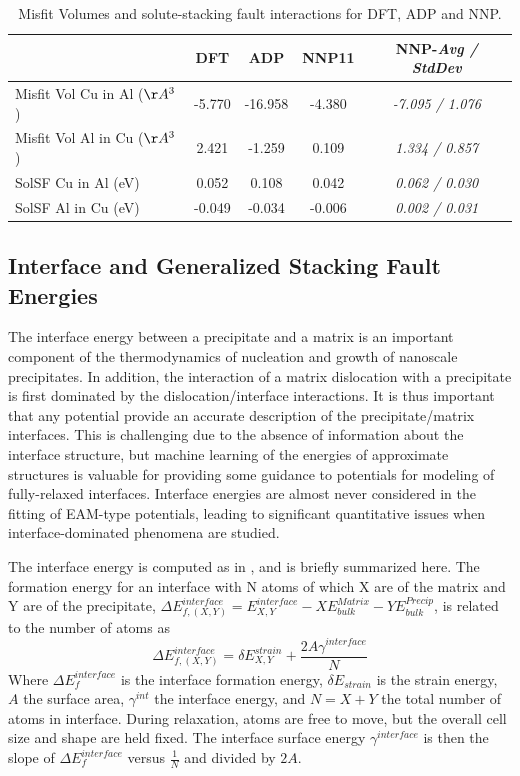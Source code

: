 \documentclass{article}
\begin{document}
\begin{table}[H]
\begin{tabular}{l|cccc}%
\hline%
&DFT&ADP&NNP11& NNP-\emph{Avg / StdDev}\\%
\hline%
Misfit Vol Cu in Al ($\AA^3$)&{-}5.770&{-}16.958&{-}4.380&\emph{-7.095 / 1.076}\\%
Misfit Vol Al in Cu ($\AA^3$)&2.421&{-}1.259&0.109&\emph{1.334 / 0.857}\\%
SolSF Cu in Al (eV)&0.052&0.108&0.042&\emph{0.062 / 0.030}\\%
SolSF Al in Cu (eV)&{-}0.049&{-}0.034&{-}0.006&\emph{0.002 / 0.031}\\%
\hline%
\end{tabular}%
\caption{Misfit Volumes and solute-stacking fault interactions for DFT, ADP and NNP.}
\label{table:solute_misfit_SF}
\end{table}

\subsection{Interface and Generalized Stacking Fault Energies} \label{sct:interfaces}

The interface energy between a precipitate and a matrix is an important component of the thermodynamics of nucleation and growth of nanoscale precipitates.  In addition, the interaction of a matrix dislocation with a precipitate is first dominated by the dislocation/interface interactions.  It is thus important that any potential provide an accurate description of the precipitate/matrix interfaces.  This is challenging due to the absence of information about the interface structure, but machine learning of the energies of approximate structures is valuable for providing some guidance to potentials for modeling of fully-relaxed interfaces.  Interface energies are almost never considered in the fitting of EAM-type potentials, leading to significant quantitative issues when interface-dominated phenomena are studied. 

The interface energy is computed as in \cite{Vaithyanathan2004MultiscaleAlloys}, and is briefly summarized here.
The formation energy for an interface with N atoms of which X are of the matrix and Y are of the precipitate,
$\Delta E^{interface}_{f, (X,Y)} = E^{interface}_{X,Y}-XE^{Matrix}_{bulk}-YE^{Precip}_{bulk}$,
is related to the number of atoms as
\begin{equation}
\Delta E^{interface}_{f,(X,Y)} = \delta E^{strain}_{X,Y} + \frac{2A\gamma^{interface}}{N}
\end{equation}
Where $\Delta E^{interface}_f$ is the interface formation energy, $\delta E_{strain}$ is the strain energy, $A$ the surface area,
$\gamma^{int}$ the interface energy, and $N=X+Y$ the total number of atoms in interface.
During relaxation, atoms are free to move, but the overall cell size and shape are held fixed.
The interface surface energy $\gamma^{interface}$ is then the slope of $\Delta E^{interface}_f$ versus $\frac{1}{N}$ and divided by $2A$.
\end{document}
